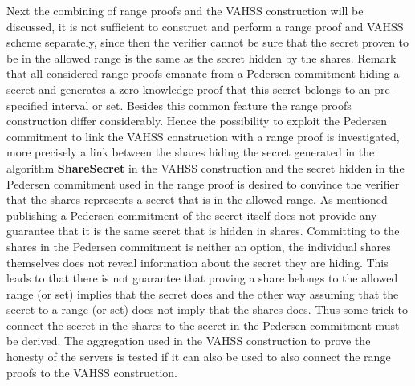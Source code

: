 Next the combining of range proofs and the VAHSS construction will be discussed, it is not sufficient to construct and perform a range proof and VAHSS  scheme separately, since then the verifier cannot be sure that the secret proven to be in the allowed range is the same as the secret hidden by the shares. Remark that all considered range proofs emanate from a Pedersen commitment hiding a secret and generates a zero knowledge proof that this secret belongs to an pre-specified interval or set. Besides this common feature the range proofs construction differ considerably. Hence the possibility to exploit the Pedersen commitment to link the VAHSS construction with a range proof is investigated, more precisely a link between the shares hiding the secret generated in the algorithm \textbf{ShareSecret} in the VAHSS construction and the secret hidden in the  Pedersen commitment used in the range proof is desired to convince the verifier that the shares represents a secret that is in the allowed range.  As mentioned publishing a Pedersen commitment of the secret itself does not provide any guarantee that it is the same secret that is hidden in shares. Committing to the shares in the Pedersen commitment is neither an option, the individual shares themselves does not reveal information about the secret they are hiding. This leads to that there is not guarantee that proving a share belongs to the allowed range (or set) implies that the secret does and the other way assuming that the secret to a range (or set) does not imply that the shares does. Thus some trick to connect the secret in the shares to the secret in the Pedersen commitment must be derived. The aggregation used in the VAHSS construction to prove the honesty of the servers is tested if it can also be used to also connect the range proofs to the VAHSS construction.

